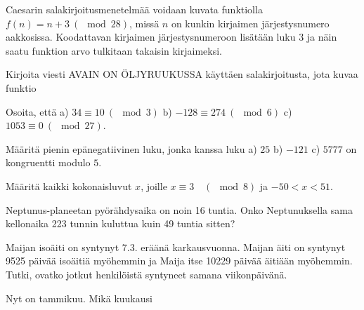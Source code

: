 \begin{tehtavasivu}
\begin{tehtava}
	Caesarin salakirjoitusmenetelmää voidaan kuvata funktiolla $f(n) = n + 3 \ (\mod 28)$, missä $n$ on kunkin kirjaimen järjestysnumero aakkosissa. Koodattavan kirjaimen järjestysnumeroon lisätään luku $3$ ja näin saatu funktion arvo tulkitaan takaisin kirjaimeksi.

	Kirjoita viesti AVAIN ON ÖLJYRUUKUSSA käyttäen salakirjoitusta, jota kuvaa funktio 
\end{tehtava}

\end{tehtavasivu}



\begin{kotitehtavasivu}

\begin{tehtava}
	Osoita, että a) $34 \equiv 10\ (\mod 3)$ b) $-128 \equiv 274\ (\mod 6)$ c) $1053 \equiv 0\ (\mod 27)$.
\end{tehtava}

\begin{tehtava}
	Määritä pienin epänegatiivinen luku, jonka kanssa luku a) $25$ b) $-121$ c) $5777$ on kongruentti modulo $5$.
\end{tehtava}

\begin{tehtava}
	Määritä kaikki kokonaisluvut $x$, joille $x \equiv 3\quad (\mod 8)$ ja $-50 < x < 51$.
\end{tehtava}

\begin{tehtava}
	Neptunus-planeetan pyörähdysaika on noin 16 tuntia. Onko Neptunuksella sama kellonaika 223 tunnin kuluttua kuin 49 tuntia sitten?
\end{tehtava}

\begin{tehtava}
	Maijan isoäiti on syntynyt 7.3. eräänä karkausvuonna. Maijan äiti on syntynyt 9525 päivää isoäitiä myöhemmin ja Maija itse 10229 päivää äitiään myöhemmin. Tutki, ovatko jotkut henkilöistä syntyneet samana viikonpäivänä.
\end{tehtava}

\begin{tehtava}
	Nyt on tammikuu. Mikä kuukausi
\end{tehtava}


\end{kotitehtavasivu}
